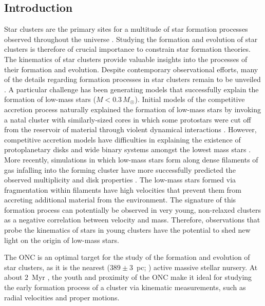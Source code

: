 \documentclass[12pt]{ucsddissertation}
\begin{document}
\begin{CJK*}{UTF8}{gbsn}
\section{Introduction}
\label{onc-sec:intro}
Star clusters are the primary sites for a multitude of star formation processes observed throughout the universe \citep[][]{Lada-2003, Gutermuth-2009}. Studying the formation and evolution of star clusters is therefore of crucial importance to constrain star formation theories. The kinematics of star clusters provide valuable insights into the processes of their formation and evolution. Despite contemporary observational efforts, many of the details regarding formation processes in star clusters remain to be unveiled \citep[e.g.,][]{Krumholz-2014}. A particular challenge has been generating models that successfully explain the formation of low-mass stars ($M < 0.3\,M_\Sun$). Initial models of the competitive accretion process naturally explained the formation of low-mass stars by invoking a natal cluster with similarly-sized cores in which some protostars were cut off from the reservoir of material through violent dynamical interactions \citep[e.g.,][]{Bate-2003}. However, competitive accretion models have difficulties in explaining the existence of protoplanetary disks and wide binary systems amongst the lowest mass stars \citep[e.g.,][]{Burgasser-2007}. More recently, simulations in which low-mass stars form along dense filaments of gas infalling into the forming cluster have more successfully predicted the observed multiplicity and disk properties \citep[e.g.,][]{Bonnell-2008, Kainulainen-2017}. The low-mass stars formed via fragmentation within filaments have high velocities that prevent them from accreting additional material from the environment. The signature of this formation process can potentially be observed in very young, non-relaxed clusters as a negative correlation between velocity and mass.  Therefore, observations that probe the kinematics of stars in young clusters have the potential to shed new light on the origin of low-mass stars.

The ONC is an optimal target for the study of the formation and evolution of star clusters, as it is the nearest ($389\pm3$~pc; \citealt{Kounkel-2018}) active massive stellar nursery. At about $2$~Myr \citep[][]{Hillenbrand-1997, Reggiani-2011}, the youth and proximity of the ONC make it ideal for studying the early formation process of a cluster via kinematic measurements, such as radial velocities and proper motions. 


\end{CJK*}
\end{document}
